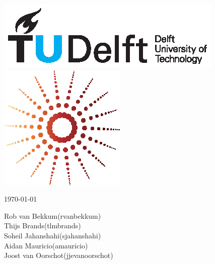 \documentclass{article}
\begin{document}
\begin{figure}
    \begin{minipage}[H]{0.33\textwidth}
		\vspace{0.3cm}
		\includegraphics[scale=0.8]{images/TUDelftLogo.eps}
	\end{minipage}
	\begin{minipage}[H]{0.33\textwidth}
		\begin{center}
		\end{center}
		\begin{center}
			\includegraphics[scale=0.8]{images/Lg.eps}	
		
		\end{center}
		\begin{center}
			\small{\today}
		\end{center}
	\end{minipage}
	\begin{minipage}[H]{0.45\textwidth}
			\begin{flushright}
				\small{Rob van Bekkum(rvanbekkum)}\\
				\small{Thijs Brands(tlmbrands)}\\
				\small{Soheil Jahanshahi(sjahanshahi)}\\
				\small{Aidan Mauricio(amauricio)}\\
				\small{Joost van Oorschot(jjevanoorschot)}\\
			\end{flushright}
	\end{minipage}
\end{figure}
\end{document}
